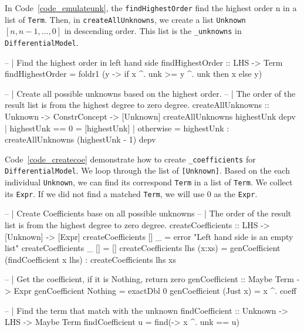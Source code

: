 In Code~\ref{code_emulateunk}, the \verb|findHighestOrder| find the highest order n in a list of \verb|Term|. Then, in \verb|createAllUnknowns|, we create a list \verb|Unknown| $[n, n-1, ..., 0]$ in descending order. This list is the \verb|_unknowns| in \verb|DifferentialModel|.

\begin{listing}[ht]
\begin{haskell1}
-- | Find the highest order in left hand side
findHighestOrder :: LHS -> Term
findHighestOrder = foldr1 (\x y -> if x ^. unk >= y ^. unk then x else y)

-- | Create all possible unknowns based on the highest order.
-- | The order of the result list is from the highest degree to zero degree.
createAllUnknowns :: Unknown -> ConstrConcept -> [Unknown]
createAllUnknowns highestUnk depv
  | highestUnk  == 0  = [highestUnk]
  | otherwise = highestUnk : createAllUnknowns (highestUnk - 1) depv
\end{haskell1}
\label{code_emulateunk}
\end{listing}

Code~\ref{code_createcoe} demonstrate how to create \verb|_coefficients| for \verb|DifferentialModel|. We loop through the list of \verb|[Unknown]|. Based on the each individual \verb|Unknown|, we can find its correspond \verb|Term| in a list of \verb|Term|. We collect its \verb|Expr|. If we did not find a matched \verb|Term|, we will use 0 as the \verb|Expr|.

\begin{listing}[ht]
\begin{haskell1}
-- | Create Coefficients base on all possible unknowns
-- | The order of the result list is from the highest degree to zero degree.
createCoefficients :: LHS -> [Unknown] -> [Expr]
createCoefficients [] _ = error "Left hand side is an empty list"
createCoefficients _ [] = []
createCoefficients lhs (x:xs) = genCoefficient (findCoefficient x lhs) : createCoefficients lhs xs

-- | Get the coefficient, if it is Nothing, return zero
genCoefficient :: Maybe Term -> Expr
genCoefficient Nothing = exactDbl 0
genCoefficient (Just x) = x ^. coeff

-- | Find the term that match with the unknown
findCoefficient :: Unknown -> LHS -> Maybe Term
findCoefficient u = find(\x -> x ^. unk == u)
\end{haskell1}
\label{code_createcoe}
\end{listing}

